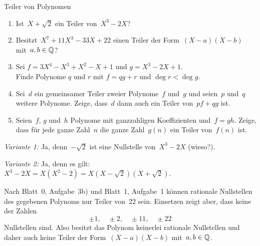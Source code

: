 \documentclass{algblatt}
\begin{document}
\begin{aufgabe}{Teiler von Polynomen}
\begin{enumerate}
\item Ist~$X+\sqrt{2}$ ein Teiler von~$X^3-2X$?
\item Besitzt~$X^7 + 11 X^3 - 33 X + 22$ einen Teiler der
Form~$(X-a)(X-b)$ mit~$a,b \in \mathbb{Q}$?
\item Sei $f = 3 X^4 - X^3 + X^2 - X + 1$ und $g = X^3 - 2 X + 1$. \\
Finde Polynome $q$ und $r$ mit $f = q g + r$ und
$\deg r < \deg g$.
\item Sei~$d$ ein gemeinsamer Teiler zweier Polynome~$f$ und~$g$ und seien~$p$
und~$q$ weitere Polynome.
Zeige, dass~$d$ dann auch ein Teiler von~$pf + qg$ ist.
\item Seien~$f$, $g$ und~$h$ Polynome mit ganzzahligen Koeffizienten und~$f =
gh$. Zeige, dass für jede ganze Zahl~$n$ die ganze Zahl~$g(n)$ ein Teiler
von~$f(n)$ ist.
\end{enumerate}
\begin{loesungE}
\item \emph{Variante 1:} Ja, denn~$-\sqrt{2}$ ist eine Nullstelle von~$X^3 -
2X$ (wieso?).

\emph{Variante 2:} Ja, denn es gilt:
$X^3 - 2X = X (X^2 - 2) = X (X - \sqrt{2}) (X + \sqrt{2})$.

\item Nach Blatt~0, Aufgabe~3b) und Blatt~1, Aufgabe~1 können
rationale Nullstellen des gegebenen Polynoms nur Teiler von~22 sein. Einsetzen
zeigt aber, dass keine der Zahlen
\[ \pm 1, \quad \pm 2, \quad \pm 11, \quad \pm 22 \]
Nullstellen sind. Also besitzt das Polynom keinerlei rationale Nullstellen und
daher auch keine Teiler der Form~$(X-a)(X-b)$ mit~$a,b \in \mathbb{Q}$.
\end{loesungE}
\end{aufgabe}
\end{document}
